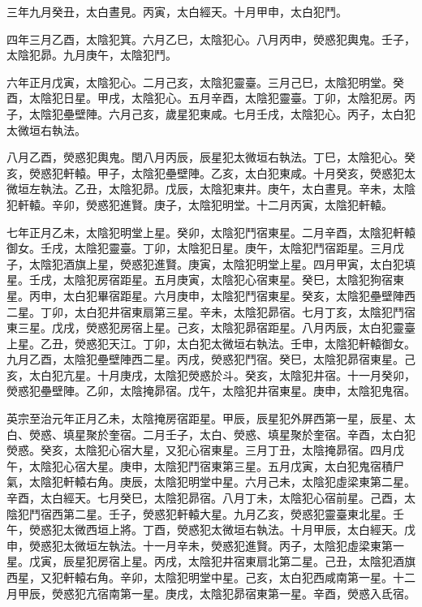 \begin{pinyinscope}
 三年九月癸丑，太白晝見。丙寅，太白經天。十月甲申，太白犯鬥。



 四年三月乙酉，太陰犯箕。六月乙巳，太陰犯心。八月丙申，熒惑犯輿鬼。壬子，太陰犯昴。九月庚午，太陰犯鬥。



 六年正月戊寅，太陰犯心。二月己亥，太陰犯靈臺。三月己巳，太陰犯明堂。癸酉，太陰犯日星。甲戌，太陰犯心。五月辛酉，太陰犯靈臺。丁卯，太陰犯房。丙子，太陰犯壘壁陣。六月己亥，歲星犯東咸。七月壬戌，太陰犯心。丙子，太白犯太微垣右執法。



 八月乙酉，熒惑犯輿鬼。閏八月丙辰，辰星犯太微垣右執法。丁巳，太陰犯心。癸亥，熒惑犯軒轅。甲子，太陰犯壘壁陣。乙亥，太白犯東咸。十月癸亥，熒惑犯太微垣左執法。乙丑，太陰犯昴。戊辰，太陰犯東井。庚午，太白晝見。辛未，太陰犯軒轅。辛卯，熒惑犯進賢。庚子，太陰犯明堂。十二月丙寅，太陰犯軒轅。



 七年正月乙未，太陰犯明堂上星。癸卯，太陰犯鬥宿東星。二月辛酉，太陰犯軒轅御女。壬戌，太陰犯靈臺。丁卯，太陰犯日星。庚午，太陰犯鬥宿距星。三月戊子，太陰犯酒旗上星，熒惑犯進賢。庚寅，太陰犯明堂上星。四月甲寅，太白犯填星。壬戌，太陰犯房宿距星。五月庚寅，太陰犯心宿東星。癸巳，太陰犯狗宿東星。丙申，太白犯畢宿距星。六月庚申，太陰犯鬥宿東星。癸亥，太陰犯壘壁陣西二星。丁卯，太白犯井宿東扇第三星。辛未，太陰犯昴宿。七月丁亥，太陰犯鬥宿東三星。戊戌，熒惑犯房宿上星。己亥，太陰犯昴宿距星。八月丙辰，太白犯靈臺上星。乙丑，熒惑犯天江。丁卯，太白犯太微垣右執法。壬申，太陰犯軒轅御女。九月乙酉，太陰犯壘壁陣西二星。丙戌，熒惑犯鬥宿。癸巳，太陰犯昴宿東星。己亥，太白犯亢星。十月庚戌，太陰犯熒惑於斗。癸亥，太陰犯井宿。十一月癸卯，熒惑犯壘壁陣。乙卯，太陰掩昴宿。戊午，太陰犯井宿東星。庚申，太陰犯鬼宿。



 英宗至治元年正月乙未，太陰掩房宿距星。甲辰，辰星犯外屏西第一星，辰星、太白、熒惑、填星聚於奎宿。二月壬子，太白、熒惑、填星聚於奎宿。辛酉，太白犯熒惑。癸亥，太陰犯心宿大星，又犯心宿東星。三月丁丑，太陰掩昴宿。四月戊午，太陰犯心宿大星。庚申，太陰犯鬥宿東第三星。五月戊寅，太白犯鬼宿積尸氣，太陰犯軒轅右角。庚辰，太陰犯明堂中星。六月己未，太陰犯虛梁東第二星。辛酉，太白經天。七月癸巳，太陰犯昴宿。八月丁未，太陰犯心宿前星。己酉，太陰犯鬥宿西第二星。壬子，熒惑犯軒轅大星。九月乙亥，熒惑犯靈臺東北星。壬午，熒惑犯太微西垣上將。丁酉，熒惑犯太微垣右執法。十月甲辰，太白經天。戊申，熒惑犯太微垣左執法。十一月辛未，熒惑犯進賢。丙子，太陰犯虛梁東第一星。戊寅，辰星犯房宿上星。丙戌，太陰犯井宿東扇北第二星。己丑，太陰犯酒旗西星，又犯軒轅右角。辛卯，太陰犯明堂中星。己亥，太白犯西咸南第一星。十二月甲辰，熒惑犯亢宿南第一星。庚戌，太陰犯昴宿東第一星。辛酉，熒惑入氐宿。




\end{pinyinscope}
